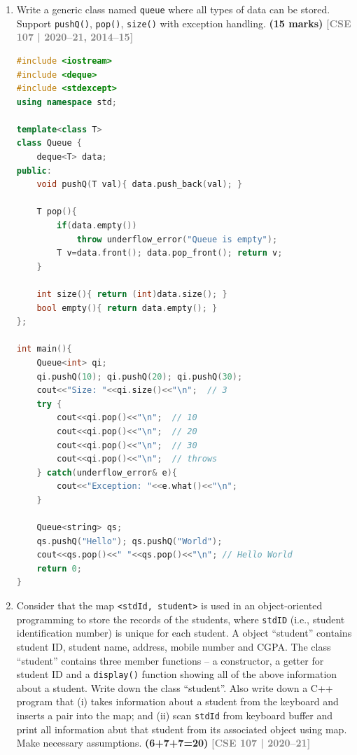 \documentclass[12pt,a3paper]{article}
\newcommand{\yr}[1]{\hfill\textcolor{gray}{\small\textbf{[#1]}}}
\newcommand{\mk}[1]{\textcolor{orange!70!black}{\small\textbf{(#1 marks)}}}
\begin{document}
\begin{enumerate}
\begin{tcolorbox}[enhanced,breakable,ansbox,colback=cH!4,colframe=cH,
  boxrule=0.8pt,arc=5pt,
  title={\textbf{Answer --- STL container types}},
  fonttitle=\bfseries\color{white},colbacktitle=cH]
\end{tcolorbox}


\item Write a generic class named \texttt{queue} where all types of data can be stored. Support \texttt{pushQ()}, \texttt{pop()}, \texttt{size()} with exception handling. \mk{15}
\yr{CSE 107 | 2020--21, 2014--15}

\begin{tcolorbox}[enhanced,breakable,ansbox,colback=cH!4,colframe=cH,
  boxrule=0.8pt,arc=5pt,
  title={\textbf{Answer --- Generic queue with pushQ, pop, size, exception handling}},
  fonttitle=\bfseries\color{white},colbacktitle=cH]

\begin{lstlisting}[language=C++]
#include <iostream>
#include <deque>
#include <stdexcept>
using namespace std;

template<class T>
class Queue {
    deque<T> data;
public:
    void pushQ(T val){ data.push_back(val); }

    T pop(){
        if(data.empty())
            throw underflow_error("Queue is empty");
        T v=data.front(); data.pop_front(); return v;
    }

    int size(){ return (int)data.size(); }
    bool empty(){ return data.empty(); }
};

int main(){
    Queue<int> qi;
    qi.pushQ(10); qi.pushQ(20); qi.pushQ(30);
    cout<<"Size: "<<qi.size()<<"\n";  // 3
    try {
        cout<<qi.pop()<<"\n";  // 10
        cout<<qi.pop()<<"\n";  // 20
        cout<<qi.pop()<<"\n";  // 30
        cout<<qi.pop()<<"\n";  // throws
    } catch(underflow_error& e){
        cout<<"Exception: "<<e.what()<<"\n";
    }

    Queue<string> qs;
    qs.pushQ("Hello"); qs.pushQ("World");
    cout<<qs.pop()<<" "<<qs.pop()<<"\n"; // Hello World
    return 0;
}
\end{lstlisting}

\end{tcolorbox}

\item Consider that the map \texttt{<stdId, student>} is used in an object-oriented programming to store the records of the students, where \texttt{stdID} (i.e., student identification number) is unique for each student. A object ``student'' contains student ID, student name, address, mobile number and CGPA. The class ``student'' contains three member functions -- a constructor, a getter for student ID and a \texttt{display()} function showing all of the above information about a student. Write down the class ``student''. Also write down a C++ program that (i) takes information about a student from the keyboard and inserts a pair into the map; and (ii) scan \texttt{stdId} from keyboard buffer and print all information abut that student from its associated object using map. Make necessary assumptions. \hfill \textbf{(6+7+7=20)}
\yr{CSE 107 | 2020--21}


\end{enumerate}
\end{document}
